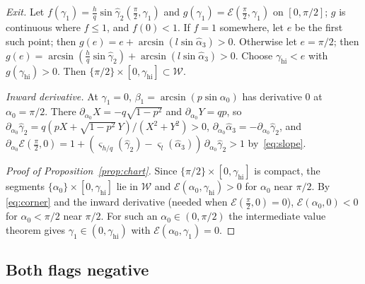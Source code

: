 \emph{Exit.} Let $f(\gamma_1)=\frac hq\sin\hat\gamma_2(\frac\pi2,\gamma_1)$ and
$g(\gamma_1)=\mathcal E(\frac\pi2,\gamma_1)$ on $[0,\pi/2]$; $g$ is continuous
where $f\le1$, and $f(0)<1$. If $f=1$ somewhere, let $e$ be the first such
point; then $g(e)=e+\arcsin(l\sin\hat\alpha_3)>0$. Otherwise let $e=\pi/2$;
then $g(e)=\arcsin(\frac hq\sin\hat\gamma_2)+\arcsin(l\sin\hat\alpha_3)>0$.
Choose $\gamma_{\mathrm{hi}}<e$ with $g(\gamma_{\mathrm{hi}})>0$. Then
$\{\pi/2\}\times[0,\gamma_{\mathrm{hi}}]\subset\mathcal W$.

\emph{Inward derivative.} At $\gamma_1=0$, $\beta_1=\arcsin(p\sin\alpha_0)$ has
derivative $0$ at $\alpha_0=\pi/2$. There $\partial_{\alpha_0}X=-q\sqrt{1-p^2}$
and $\partial_{\alpha_0}Y=qp$, so
$\partial_{\alpha_0}\hat\gamma_2=q(pX+\sqrt{1-p^2}\,Y)/(X^2+Y^2)>0$,
$\partial_{\alpha_0}\hat\alpha_3=-\partial_{\alpha_0}\hat\gamma_2$, and
$\partial_{\alpha_0}\mathcal E(\frac\pi2,0)
=1+(\varsigma_{h/q}(\hat\gamma_2)-\varsigma_l(\hat\alpha_3))\,\partial_{\alpha_0}\hat\gamma_2>1$
by~\eqref{eq:slope}.

\begin{proof}[Proof of Proposition~\ref{prop:chart}]
Since $\{\pi/2\}\times[0,\gamma_{\mathrm{hi}}]$ is compact, the segments
$\{\alpha_0\}\times[0,\gamma_{\mathrm{hi}}]$ lie in $\mathcal W$ and
$\mathcal E(\alpha_0,\gamma_{\mathrm{hi}})>0$ for $\alpha_0$ near $\pi/2$. By
\eqref{eq:corner} and the inward derivative (needed when
$\mathcal E(\frac\pi2,0)=0$), $\mathcal E(\alpha_0,0)<0$ for
$\alpha_0<\pi/2$ near $\pi/2$. For such an $\alpha_0\in(0,\pi/2)$ the
intermediate value theorem gives $\gamma_1\in(0,\gamma_{\mathrm{hi}})$ with
$\mathcal E(\alpha_0,\gamma_1)=0$.
\end{proof}

\subsection{Both flags negative}

